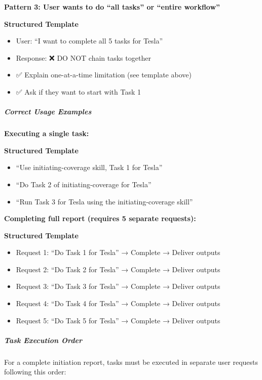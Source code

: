 \documentclass[11pt]{article}
\begin{document}
\textbf{Pattern 3: User wants to do ``all tasks'' or ``entire workflow''}

\textbf{Structured Template}
\begin{itemize}[leftmargin=*,itemsep=2pt,topsep=2pt]
\item {} User: ``I want to complete all 5 tasks for Tesla''
\item {} Response: ❌ DO NOT chain tasks together
\item {} ✅ Explain one-at-a-time limitation (see template above)
\item {} ✅ Ask if they want to start with Task 1
\end{itemize}

\subparagraph{Correct Usage Examples}\mbox{}\par

\textbf{Executing a single task:}

\textbf{Structured Template}
\begin{itemize}[leftmargin=*,itemsep=2pt,topsep=2pt]
\item {} ``Use initiating-coverage skill, Task 1 for Tesla''
\item {} ``Do Task 2 of initiating-coverage for Tesla''
\item {} ``Run Task 3 for Tesla using the initiating-coverage skill''
\end{itemize}

\textbf{Completing full report (requires 5 separate requests):}

\textbf{Structured Template}
\begin{itemize}[leftmargin=*,itemsep=2pt,topsep=2pt]
\item {} Request 1: ``Do Task 1 for Tesla'' → Complete → Deliver outputs
\item {} Request 2: ``Do Task 2 for Tesla'' → Complete → Deliver outputs
\item {} Request 3: ``Do Task 3 for Tesla'' → Complete → Deliver outputs
\item {} Request 4: ``Do Task 4 for Tesla'' → Complete → Deliver outputs
\item {} Request 5: ``Do Task 5 for Tesla'' → Complete → Deliver outputs
\end{itemize}

\subparagraph{Task Execution Order}\mbox{}\par

For a complete initiation report, tasks must be executed in separate user requests following this order:
\end{document}
